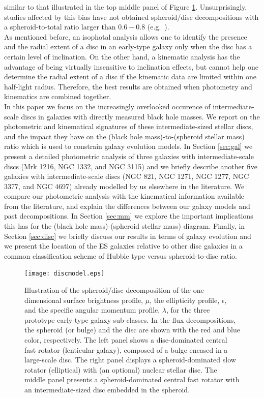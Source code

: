 \documentclass[useAMS,usenatbib,article]{mnras}
\begin{document}
{similar to that illustrated in the top middle panel of Figure \ref{fig:model}. 
Unsurprisingly, studies affected by this bias have not obtained spheroid/disc decompositions with a spheroid-to-total ratio larger than $0.6 - 0.8$ 
(e.g.~\citealt{gadotti2008,head2014,querejeta2015,mendezabreu2015}). \\
As mentioned before, an isophotal analysis allows one to identify the presence and the radial extent of a disc in an early-type galaxy 
only when the disc has a certain level of inclination. 
On the other hand, a kinematic analysis has the advantage of being virtually insensitive to inclination effects, 
but cannot help one determine the radial extent of a disc if the kinematic data are limited within one half-light radius. 
Therefore, the best results are obtained when photometry and kinematics are combined together. \\
In this paper we focus on the increasingly overlooked occurence of intermediate-scale discs in galaxies with directly measured black hole masses. 
We report on the photometric and kinematical signatures of these intermediate-sized stellar discs,  
and the impact they have on the (black hole mass)-to-(spheroid stellar mass) ratio 
which is used to constrain galaxy evolution models. 
In Section \ref{sec:gal} we present a detailed photometric analysis of three galaxies with intermediate-scale discs (Mrk 1216, NGC 1332, and NGC 3115) 
and we briefly describe another five galaxies with intermediate-scale discs (NGC 821, NGC 1271, NGC 1277, NGC 3377, and NGC 4697) 
already modelled by us elsewhere in the literature. 
We compare our photometric analysis with the kinematical information available from the literature, 
and explain the differences between our galaxy models and past decompositions. 
In Section \ref{sec:mm} we explore the important implications this has for the (black hole mass)-(spheroid stellar mass) diagram. 
Finally, in Section \ref{sec:disc} we briefly discuss our results in terms of galaxy evolution 
and we present the location of the ES galaxies relative to other disc galaxies 
in a common classification scheme of Hubble type versus spheroid-to-disc ratio. }




\begin{figure}
\begin{center}
\texttt{[image: discmodel.eps]}
\caption{Illustration of the spheroid/disc decomposition of the one-dimensional surface brightness profile, $\mu$, 
the ellipticity profile, $\epsilon$, and the specific angular momentum profile, $\lambda$,
for the three prototype early-type galaxy sub-classes. 
In the flux decompositions, the spheroid (or bulge) and the disc are shown with the red and blue color, respectively. 
The left panel shows a disc-dominated central fast rotator (lenticular galaxy), composed of a bulge encased in a large-scale disc. 
The right panel displays a spheroid-dominated slow rotator (elliptical) with (an optional) nuclear stellar disc. 
The middle panel presents a spheroid-dominated central fast rotator with an intermediate-sized disc embedded in the spheroid. }
\label{fig:model}
\end{center}
\end{figure}
\end{document}

